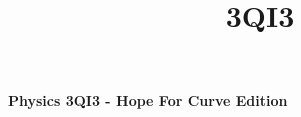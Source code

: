 \documentclass[letterpaper, 8pt]{extarticle}
\title{3QI3}
\begin{document}
\raggedright
\tiny


\begin{center}
    {\textbf{Physics 3QI3 - Hope For Curve Edition}} \\
\end{center}
\setlength{\premulticols}{1pt}
\setlength{\postmulticols}{1pt}
\setlength{\multicolsep}{1pt}
\setlength{\columnsep}{2pt}
\end{document}
